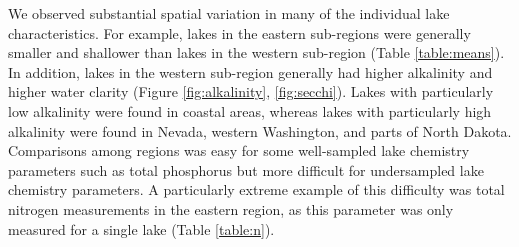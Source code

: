 \documentclass[journal abbreviations, manuscript]{copernicus}
\begin{document}
We observed substantial spatial variation in many of the individual lake characteristics. For example, lakes in the eastern sub-regions were generally smaller and shallower than lakes in the western sub-region (Table \ref{table:means}). In addition, lakes in the western sub-region generally had higher alkalinity and higher water clarity (Figure \ref{fig:alkalinity}, \ref{fig:secchi}). Lakes with particularly low alkalinity were found in coastal areas, whereas lakes with particularly high alkalinity were found in Nevada, western Washington, and parts of North Dakota. Comparisons among regions was easy for some well-sampled lake chemistry parameters such as total phosphorus but more difficult for undersampled lake chemistry parameters. A particularly extreme example of this difficulty was total nitrogen measurements in the eastern region, as this parameter was only measured for a single lake (Table \ref{table:n}). 
\end{document}
